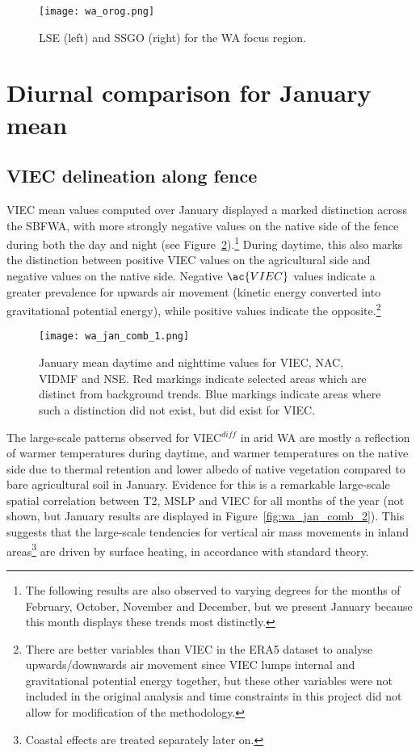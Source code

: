 \begin{figure}[!ht]
	\centering
	\texttt{[image: wa\_orog.png]}
	\caption[Orography for WA focus region]{\acf{LSE} (left) and \acf{SSGO} (right) for the \ac{WA} focus region.}
	\label{fig:wa_orog}
\end{figure}

\section{Diurnal comparison for January mean}

\subsection{VIEC delineation along fence}

\ac{VIEC} mean values computed over January displayed a marked distinction across the \acf{SBFWA}, with more strongly negative values on the native side of the fence during both the day and night (see Figure~\ref{fig:wa_jan_comb_1}).\footnote{The following results are also observed to varying degrees for the months of February, October, November and December, but we present January because this month displays these trends most distinctly.} During daytime, this also marks the distinction between positive \ac{VIEC} values on the agricultural side and negative values on the native side. Negative $\ac{VIEC}$ values indicate a greater prevalence for upwards air movement (kinetic energy converted into gravitational potential energy), while positive values indicate the opposite.\footnote{There are better variables than \ac{VIEC} in the ERA5 dataset to analyse upwards/downwards air movement since \ac{VIEC} lumps internal and gravitational potential energy together, but these other variables were not included in the original analysis and time constraints in this project did not allow for modification of the methodology.}

\begin{figure}[!ht]
	\centering
	\texttt{[image: wa\_jan\_comb\_1.png]}
	\caption[January means for selected variables 1]{January mean daytime and nighttime values for \acs{VIEC}, \acs{NAC}, \acs{VIDMF} and \acs{NSE}. Red markings indicate selected areas which are distinct from background trends. Blue markings indicate areas where such a distinction did not exist, but did exist for \acs{VIEC}.}
	\label{fig:wa_jan_comb_1}
\end{figure}

The large-scale patterns observed for \ac{VIEC}$^{diff}$ in arid \ac{WA} are mostly a reflection of warmer temperatures during daytime, and warmer temperatures on the native side due to thermal retention and lower albedo of native vegetation compared to bare agricultural soil in January. Evidence for this is a remarkable large-scale spatial correlation between \ac{T2}, \ac{MSLP} and \ac{VIEC} for all months of the year (not shown, but January results are displayed in Figure~\ref{fig:wa_jan_comb_2}). This suggests that the large-scale tendencies for vertical air mass movements in inland areas\footnote{Coastal effects are treated separately later on.} are driven by surface heating, in accordance with standard theory.

